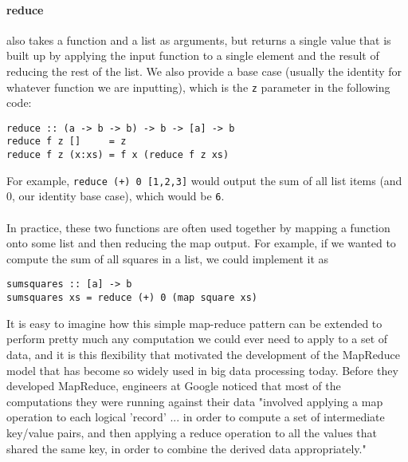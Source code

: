 \documentclass[11pt,a4paper]{report}
\begin{document}
\paragraph{reduce} also takes a function and a list as arguments, but returns a single value that is built up by applying the input function to a single element and the result of reducing the rest of the list. We also provide a base case (usually the identity for whatever function we are inputting), which is the \lstinline{z} parameter in the following code:
\begin{lstlisting}
reduce :: (a -> b -> b) -> b -> [a] -> b
reduce f z []     = z 
reduce f z (x:xs) = f x (reduce f z xs) 
\end{lstlisting}
For example, \lstinline{reduce (+) 0 [1,2,3]} would output the sum of all list items (and 0, our identity base case), which would be \lstinline{6}.

\paragraph*{}
In practice, these two functions are often used together by mapping a function onto some list and then reducing the map output. For example, if we wanted to compute the sum of all squares in a list, we could implement it as 
\begin{lstlisting}
sumsquares :: [a] -> b
sumsquares xs = reduce (+) 0 (map square xs)
\end{lstlisting}
It is easy to imagine how this simple map-reduce pattern can be extended to perform pretty much any computation we could ever need to apply to a set of data, and it is this flexibility that motivated the development of the MapReduce model that has become so widely used in big data processing today.  Before they developed MapReduce, engineers at Google noticed that most of the computations they were running against their data "involved applying a map operation to each logical 'record' ... in order to compute a set of intermediate key/value pairs, and then applying a reduce operation to all the values that shared the same key, in order to combine the derived data appropriately."\cite{dean2008mapreduce} 
\end{document}
